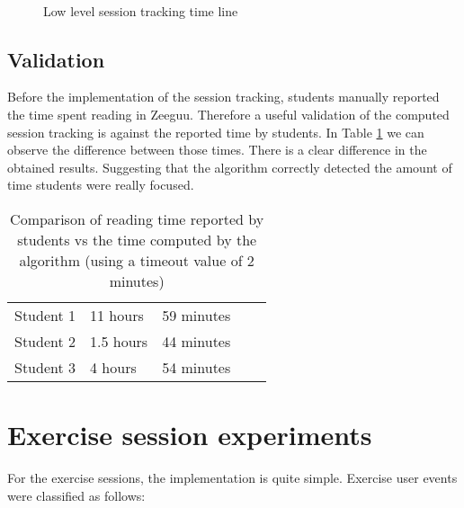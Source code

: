 \begin{figure}[!htb]
	\myfloatalign
	 \quad 
		
	 \\
	\caption{Low level session tracking time line}\label{fig:detailed_session_comparison}
\end{figure}


\subsection{Validation}
Before the implementation of the session tracking, students manually reported the time spent reading in Zeeguu. Therefore a useful validation of the computed session tracking is against the reported time by students.
In Table \ref{tb:comparison_read_time} we can observe the difference between those times. There is a clear difference in the obtained results. Suggesting that the algorithm correctly detected the amount of time students were really focused.

\begin{table}[!htb]
	\begin{tabularx}
		{\textwidth}{Xllll}\toprule
		\tableheadline{Student} & 
		\tableheadline{Reported time} &
		\tableheadline{Computed time} \\ 
		\midrule 
		Student 1
		 & 11 hours
		  & 59 minutes
		   \\ 
		\hline 
		Student 2
		 & 1.5 hours
		  & 44 minutes
		   \\ 
		\hline
		Student 3
		 & 4 hours
		  & 54 minutes
		  \\ 
		\hline 
	\end{tabularx} 
	\caption{Comparison of reading time reported by students vs the time computed by the algorithm (using a timeout value of 2 minutes)}\label{tb:comparison_read_time}
\end{table}

\section{Exercise session experiments}
For the exercise sessions, the implementation is quite simple. Exercise user events were classified as follows:


